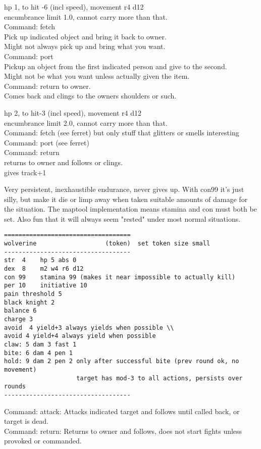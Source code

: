hp 1, to hit -6 (incl speed), movement r4 d12 \\
encumbrance limit 1.0, cannot carry more than that. \\
Command: fetch \\
Pick up indicated object and bring it back to owner. \\
Might not always pick up and bring what you want. \\
Command: port \\
Pickup an object from the first indicated person and give to the second. \\
Might not be what you want unless actually given the item. \\
Command: return to owner. \\
Comes back and clings to the owners shoulders or such.


hp 2, to hit-3 (incl speed), movement r4 d12 \\
encumbrance limit 2.0, cannot carry more than that. \\
Command: fetch (see ferret) but only stuff that glitters or smells interesting \\
Command: port (see ferret) \\
Command: return \\
returns to owner and follows or clings. \\
gives track+1


Very persistent, inexhaustible endurance, never gives up. With con99 it's just silly, but make it die or limp away when taken suitable amounts of damage for the situation. The maptool implementation means stamina and con must both be set. Also fun that it will always seem "rested" under most normal situations.
\goodbreak \small \begin{samepage} \begin{verbatim}
===================================
wolverine                   (token)  set token size small
-----------------------------------
str  4    hp 5 abs 0
dex  8    m2 w4 r6 d12
con 99    stamina 99 (makes it near impossible to actually kill)
per 10    initiative 10
pain threshold 5
black knight 2
balance 6
charge 3
avoid  4 yield+3 always yields when possible \\
avoid 4 yield+4 always yield when possible
claw: 5 dam 3 fast 1
bite: 6 dam 4 pen 1
hold: 9 dam 2 pen 2 only after successful bite (prev round ok, no movement)
                    target has mod-3 to all actions, persists over rounds
-----------------------------------
\end{verbatim} \end{samepage} \normalsize
Command: attack: Attacks indicated target and follows until called back, or target is dead. \\
Command: return: Returns to owner and follows, does not start fights unless provoked or commanded.


